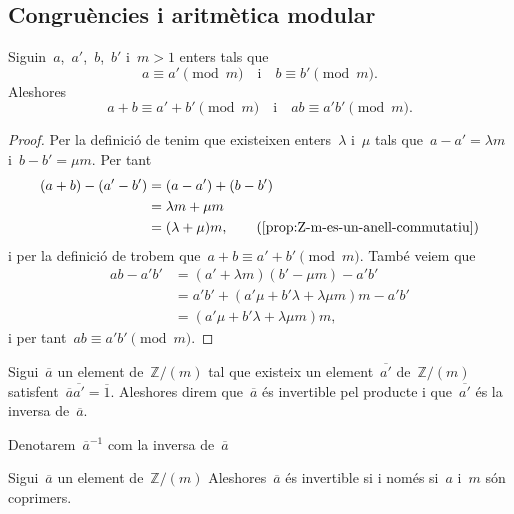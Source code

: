 \documentclass[../../main.tex]{subfiles}
\begin{document}
    \subsection{Congruències i aritmètica modular}
    \begin{proposition}
        Siguin~\(a\),~\(a'\),~\(b\),~\(b'\) i~\(m>1\) enters tals que
        \[
            a\equiv a'\pmod{m}\quad\text{i}\quad b\equiv b'\pmod{m}.
        \]
        Aleshores
        \[
            a+b\equiv a'+b'\pmod{m}\quad\text{i}\quad ab\equiv a'b'\pmod{m}.
        \]
    \end{proposition}
    \begin{proof}
        Per la definició de  tenim que existeixen enters~\(\lambda\) i~\(\mu\) tals que~\(a-a'=\lambda m\) i~\(b-b'=\mu m\).
        Per tant
        \begin{align*}
        (a+b)-(a'-b')&=(a-a')+(b-b')\\
        &=\lambda m+\mu m\\
        &=(\lambda+\mu)m,\tag{\ref{prop:Z-m-es-un-anell-commutatiu}}
        \end{align*}
        i per la definició de  trobem que~\(a+b\equiv a'+b'\pmod{m}\).
        També veiem que
        \begin{align*}
        ab-a'b'&=(a'+\lambda m)(b'-\mu m)-a'b'\\
        &=a'b'+(a'\mu+b'\lambda+\lambda\mu m)m-a'b'\\
        &=(a'\mu+b'\lambda+\lambda\mu m)m,
        \end{align*}
        i per tant~\(ab\equiv a'b'\pmod{m}\).
    \end{proof}
    \begin{definition}
        \label{def:nombre-modular-invertible}
        Sigui~\(\overline{a}\) un element de~\(\mathbb{Z}/(m)\) tal que existeix un element~\(\overline{a'}\) de~\(\mathbb{Z}/(m)\) satisfent~\(\overline{a}\overline{a'}=\overline{1}\).
        Aleshores direm que~\(\overline{a}\) és invertible pel producte i que~\(\overline{a'}\) és la inversa de~\(\overline{a}\).

        Denotarem~\(\overline{a}^{-1}\) com la inversa de~\(\overline{a}\)
    \end{definition}
    \begin{proposition}
        \label{prop:condicio-equivalent-a-invertible-en-Z-m}
        Sigui~\(\overline{a}\) un element de~\(\mathbb{Z}/(m)\) Aleshores~\(\overline{a}\) és invertible si i només si~\(a\) i~\(m\) són coprimers.
    \end{proposition}
\end{document}
